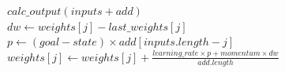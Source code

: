 \documentclass[a4paper,12pt, twoside]{article}
\begin{document}
\begin{algorithmic}

\State $calc\_output(inputs + add)$
\\
\State $dw \gets weights[j] - last\_weights[j]$
\State $p \gets (goal - state ) \times add[inputs.length - j]$
\State $weights[j] \gets weights[j] + \frac{learning\_rate \times p + momentum \times dw}{add.length} $
\EndFor
\EndFunction

\end{algorithmic}
\end{document}
